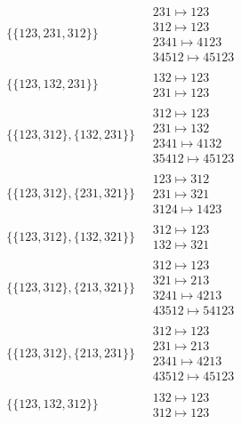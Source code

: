 \begin{scriptsize}
\begin{align}
\begin{matrix}
\end{matrix}
\\
\{\{123, 231, 312\}\}
\ 
&
\begin{matrix}
231 \mapsto 123\\312 \mapsto 123\\2341 \mapsto 4123\\34512 \mapsto 45123
\end{matrix}
\\
\{\{123, 132, 231\}\}
\ 
&
\begin{matrix}
132 \mapsto 123\\231 \mapsto 123
\end{matrix}
\\
\{\{123, 312\}, \{132, 231\}\}
\ 
&
\begin{matrix}
312 \mapsto 123\\231 \mapsto 132\\2341 \mapsto 4132\\35412 \mapsto 45123
\end{matrix}
\\
\{\{123, 312\}, \{231, 321\}\}
\ 
&
\begin{matrix}
123 \mapsto 312\\231 \mapsto 321\\3124 \mapsto 1423
\end{matrix}
\\
\{\{123, 312\}, \{132, 321\}\}
\ 
&
\begin{matrix}
312 \mapsto 123\\132 \mapsto 321
\end{matrix}
\\
\{\{123, 312\}, \{213, 321\}\}
\ 
&
\begin{matrix}
312 \mapsto 123\\321 \mapsto 213\\3241 \mapsto 4213\\43512 \mapsto 54123
\end{matrix}
\\
\{\{123, 312\}, \{213, 231\}\}
\ 
&
\begin{matrix}
312 \mapsto 123\\231 \mapsto 213\\2341 \mapsto 4213\\43512 \mapsto 45123
\end{matrix}
\\
\{\{123, 132, 312\}\}
\ 
&
\begin{matrix}
132 \mapsto 123\\312 \mapsto 123
\end{matrix}

\end{align}
\end{scriptsize}
